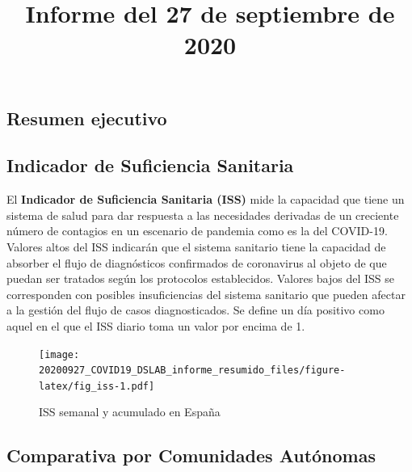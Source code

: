 \documentclass[
  11pt,
]{article}
\title{Informe del 27 de septiembre de 2020}
\author{}
\date{\vspace{-2.5em}}
\begin{document}
\maketitle

\renewcommand{\figurename}{Figura}
\renewcommand{\tablename}{Tabla}

\vspace{-0.5cm}

\hypertarget{resumen-ejecutivo}{%
\subsection{Resumen ejecutivo}\label{resumen-ejecutivo}}

\hypertarget{indicador-de-suficiencia-sanitaria}{%
\subsection{Indicador de Suficiencia
Sanitaria}\label{indicador-de-suficiencia-sanitaria}}

El \textbf{Indicador de Suficiencia Sanitaria (ISS)} mide la capacidad
que tiene un sistema de salud para dar respuesta a las necesidades
derivadas de un creciente número de contagios en un escenario de
pandemia como es la del COVID-19. Valores altos del ISS indicarán que el
sistema sanitario tiene la capacidad de absorber el flujo de
diagnósticos confirmados de coronavirus al objeto de que puedan ser
tratados según los protocolos establecidos. Valores bajos del ISS se
corresponden con posibles insuficiencias del sistema sanitario que
pueden afectar a la gestión del flujo de casos diagnosticados. Se define
un día positivo como aquel en el que el ISS diario toma un valor por
encima de 1.

\vspace{0.2cm}

\begin{figure}
\centering
\texttt{[image: 20200927\_COVID19\_DSLAB\_informe\_resumido\_files/figure-latex/fig\_iss-1.pdf]}
\caption{\label{fig:fig_iss} ISS semanal y acumulado en España}
\end{figure}

\clearpage

\hypertarget{comparativa-por-comunidades-autuxf3nomas}{%
\subsection{Comparativa por Comunidades
Autónomas}\label{comparativa-por-comunidades-autuxf3nomas}}
\end{document}
